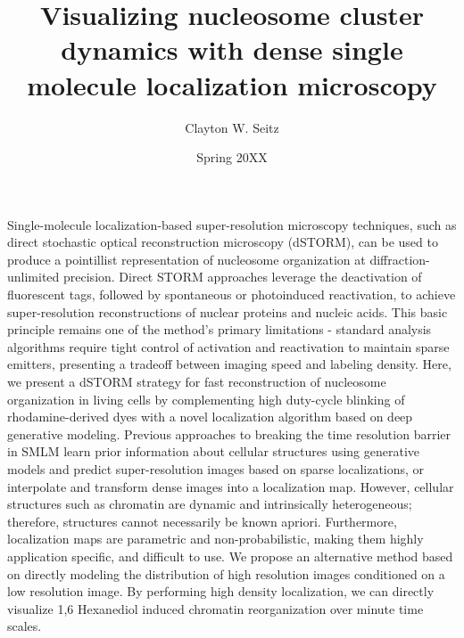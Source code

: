 \documentclass{ucetd}
\title{Visualizing nucleosome cluster dynamics with dense single molecule localization microscopy}
\author{Clayton W. Seitz}
\date{Spring 20XX}
\begin{document}
\maketitle

\makecopyright


\tableofcontents


\abstract

Single-molecule localization-based super-resolution microscopy techniques, such as direct stochastic optical reconstruction microscopy (dSTORM), can be used to produce a pointillist representation of nucleosome organization at diffraction-unlimited precision. Direct STORM approaches leverage the deactivation of fluorescent tags, followed by spontaneous or photoinduced reactivation, to achieve super-resolution reconstructions of nuclear proteins and nucleic acids. This basic principle remains one of the method's primary limitations - standard analysis algorithms require tight control of activation and reactivation to maintain sparse emitters, presenting a tradeoff between imaging speed and labeling density. Here, we present a dSTORM strategy for fast reconstruction of nucleosome organization in living cells by complementing high duty-cycle blinking of rhodamine-derived dyes with a novel localization algorithm based on deep generative modeling. Previous approaches to breaking the time resolution barrier in SMLM learn prior information about cellular structures using generative models and predict super-resolution images based on sparse localizations, or interpolate and transform dense images into a localization map. However, cellular structures such as chromatin are dynamic and intrinsically heterogeneous; therefore, structures cannot necessarily be known apriori. Furthermore, localization maps are parametric and non-probabilistic, making them highly application specific, and difficult to use. We propose an alternative method based on directly modeling the distribution of high resolution images conditioned on a low resolution image. By performing high density localization, we can directly visualize 1,6 Hexanediol induced chromatin reorganization over minute time scales.
\end{document}
